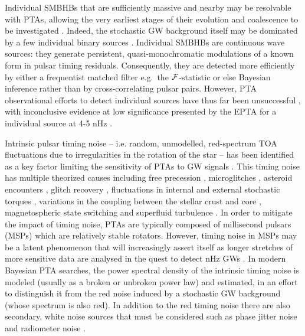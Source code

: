 \documentclass[fleqn,usenatbib,useAMS]{mnras}
\begin{document}
Individual SMBHBs that are sufficiently massive and nearby may be resolvable with PTAs, allowing the very earliest stages of their evolution and coalescence to be investigated \citep{Sesana2010,Yardley2010,Zhu10,Babak2012,2013CQGra..30v4004E,Zhupulsarterms}. 
Indeed, the stochastic GW background itself may be dominated by a few individual binary sources \citep{Ravi2012singlesource}. Individual SMBHBs are continuous wave sources: they generate persistent, quasi-monochromatic modulations of a known form in pulsar timing residuals. Consequently, they are detected more efficiently by either a frequentist matched filter e.g.\ the ${\cal F}$-statistic \citep{Lee2011MNRAS.414.3251L, Ellis2012ApJ,Zhu2014PPTA} or else Bayesian inference \citep{Ellis2016,Arzoumanian2020A} rather than by cross-correlating pulsar pairs. However, PTA observational efforts to detect individual sources have thus far been unsuccessful \citep{Jenet2004,Zhu2014PPTA,Babak2016,Arzoumanian2023}, with inconclusive evidence at low significance presented by the EPTA for a individual source at 4-5 nHz \citep{2023arXiv230616226A}. \newline 


Intrinsic pulsar timing noise -- i.e.  random, unmodelled, red-spectrum TOA fluctuations due to irregularities in the rotation of the star -- has been identified as a key factor limiting the sensitivity of PTAs to GW signals \citep{Shannon2010,Lasky2015,Caballero2016,Goncharov2021}. This timing noise has multiple theorized causes including free precession \citep{free_precession_kerr,stairs_freeprecession}, microglitches \citep{Alessandro1995,Melatos2008,Espinoza2021}, asteroid encounters \citep{Shannon_2013,Brook_2014}, glitch recovery \citep{Johnston10,Hobbs2010glitch}, fluctuations in internal and external stochastic torques \citep{Cordes1981, 2006MNRAS.370L..76U,Antonelli2023}, variations in the coupling between the stellar crust and core \citep{Jones1990MNRAS.246..364J,Meyers2021,Melatos2023}, magnetospheric state switching \citep{magneto1,Lyne2010L,Stairs2019MNRAS.485.3230S} and superfluid turbulence \citep{Greenstein1970,Peralta2006,Melatos2014}. In order to mitigate the impact of timing noise, PTAs are typically composed of millisecond pulsars (MSPs) which are relatively stable rotators. However, timing noise in MSPs may be a latent phenomenon that will increasingly assert itself as longer stretches of more sensitive data are analysed in the quest to detect nHz GWs \citep{Shannon2010}. In modern Bayesian PTA searches, the power spectral density of the intrinsic timing noise is modeled (usually as a broken or unbroken power law) and estimated, in an effort to distinguish it from the red noise induced by a stochastic GW background (whose spectrum is also red). In addition to the red timing noise there are also secondary, white noise sources that must be considered such as phase jitter noise and radiometer noise \citep{Cordes2010,Lam2019,Parthasarathy2021}. \newline 
\end{document}
